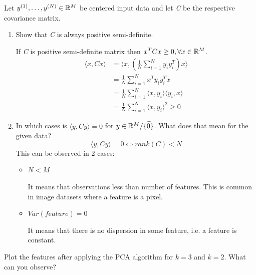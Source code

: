 \documentclass{homework}
\begin{document}
Let $y^{(1)}, \dots, y^{(N)} \in \mathbb R^M$ be centered input data and let \emph{C} be the respective covariance matrix.
\begin{enumerate}
	\item Show that \emph{C} is always positive semi-definite.

	If \emph{C} is  positive semi-definite matrix then $x^TCx \geq 0, \forall x \in \mathbb R^M$.
	\begin{align*}
	\langle x,Cx\rangle&=\langle x,(\frac{1}{N}\sum_{i=1}^Ny_i y_i^T)x\rangle \\
	&=\frac{1}{N}\sum_{i=1}^N x^T y_i y_i^T x \\
	&=\frac{1}{N}\sum_{i=1}^N \langle x, y_i\rangle \langle y_i, x\rangle \\
	&=\frac{1}{N}\sum_{i=1}^N \langle x, y_i\rangle^2 \geq 0
	\end{align*}
	\item In which cases is $\langle y,Cy\rangle = 0$ for $y \in \mathbb R^M / \vec{\{0\}}$. What does that mean for the given data?
	 \[\langle y,Cy\rangle = 0 \Longleftrightarrow rank(C) < N\]
	This can be observed in 2 cases:
	\begin{itemize}
		\item $N < M$

		It means that observations less than number of features. This is common in image datasets where a feature is a pixel.
		\item $Var(feature) = 0$

		It means that there is no dispersion in some feature, i.e. a feature is constant.
	\end{itemize}
\end{enumerate}

Plot the features after applying the PCA algorithm for $k=3$ and $k=2$. What can you observe?
\end{document}
